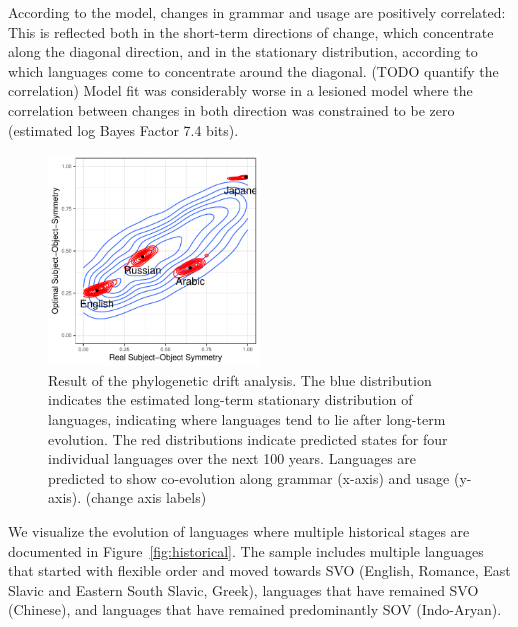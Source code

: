 \documentclass[11pt,a4paper]{article}
\newcommand\mhahn[1]{{\color{red}(#1)}}
\begin{document}
According to the model, changes in grammar and usage are positively correlated:
This is reflected both in the short-term directions of change, which concentrate along the diagonal direction, and in the stationary distribution, according to which languages come to concentrate around the diagonal. \mhahn{TODO quantify the correlation}
Model fit was considerably worse in a lesioned model where the correlation between changes in both direction was constrained to be zero (estimated log Bayes Factor 7.4 bits).


\begin{figure}
    \centering
    \includegraphics[width=0.5\textwidth]{change/visualize/stationary.pdf}
    \caption{Result of the phylogenetic drift analysis.
    The blue distribution indicates the estimated long-term stationary distribution of languages, indicating where languages tend to lie after long-term evolution.
    The red distributions indicate predicted states for four individual languages over the next 100 years. Languages are predicted to show co-evolution along grammar (x-axis)  and usage (y-axis). \mhahn{change axis labels}}
    \label{fig:drift-model}
\end{figure}



We visualize the evolution of languages where multiple historical stages are documented in Figure~\ref{fig:historical}.
The sample includes multiple languages that started with flexible order and moved towards SVO (English, Romance, East Slavic and Eastern South Slavic, Greek), languages that have remained SVO (Chinese), and languages that have remained predominantly SOV (Indo-Aryan).
\end{document}
